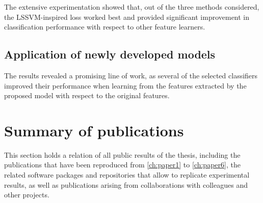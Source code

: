 
The extensive experimentation showed that, out of the three methods considered, the LSSVM-inspired loss worked best and provided significant improvement in classification performance with respect to other feature learners.

\subsection{Application of newly developed models}


The results revealed a promising line of work, as several of the selected classifiers improved their performance when learning from the features extracted by the proposed model with respect to the original features.

\section{Summary of publications}

This section holds a relation of all public results of the thesis, including the publications that have been reproduced from \autoref{ch:paper1} to \autoref{ch:paper6}, the related software packages and repositories that allow to replicate experimental results, as well as publications arising from collaborations with colleagues and other projects.

